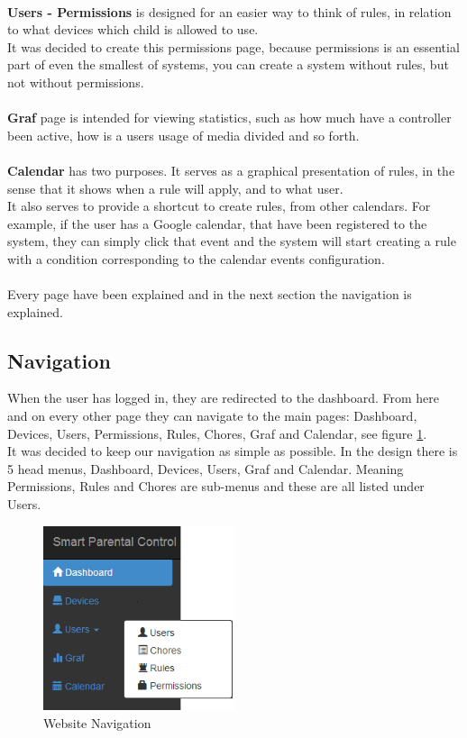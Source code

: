 \\
\textbf{Users - Permissions} is designed for an easier way to think of rules, in relation to what devices which child is allowed to use.\\
It was decided to create this permissions page, because permissions is an essential part of even the smallest of systems, you can create a system without rules, but not without permissions.\\ %
\\
\textbf{Graf} page is intended for viewing statistics, such as how much have a controller been active, how is a users usage of media divided and so forth.\\
\\
\textbf{Calendar} has two purposes. It serves as a graphical presentation of rules, in the sense that it shows when a rule will apply, and to what user.\\
It also serves to provide a shortcut to create rules, from other calendars. For example, if the user has a Google calendar, that have been registered to the system, they can simply click that event and the system will start creating a rule with a condition corresponding to the calendar events configuration.\\
\\
Every page have been explained and in the next section the navigation is explained.
\subsection{Navigation}
When the user has logged in, they are redirected to the dashboard. From here and on every other page they can navigate to the main pages: Dashboard, Devices, Users, Permissions, Rules, Chores, Graf and Calendar, see figure \ref{fig:navigationOfWebsite}.\\
It was decided to keep our navigation as simple as possible. In the design there is 5 head menus, Dashboard, Devices, Users, Graf and Calendar. Meaning Permissions, Rules and Chores are sub-menus and these are all listed under Users.\\


\begin{figure}[htbp]
	\centering
		\includegraphics[width=0.50\textwidth]{images/navigationOfWebsite.png}
	\caption{Website Navigation}
	\label{fig:navigationOfWebsite}
\end{figure}


